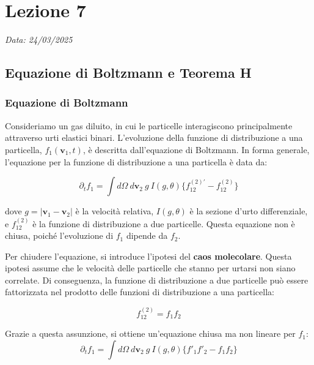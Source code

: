 \chapter{Lezione 7}
\label{chap:lezione_07} %

\begin{flushright}
\textit{Data: 24/03/2025}
\end{flushright}


\section{Equazione di Boltzmann e Teorema H}

\subsection{Equazione di Boltzmann}
Consideriamo un gas diluito, in cui le particelle interagiscono principalmente attraverso urti elastici binari. L'evoluzione della funzione di distribuzione a una particella, $f_1(\mathbf{v}_1, t)$, è descritta dall'equazione di Boltzmann. In forma generale, l'equazione per la funzione di distribuzione a una particella è data da:

\begin{equation}
\partial_{t}f_{1}=\int d\Omega~d\mathbf{v}_{2}~g~I(g,\theta)\{f_{12}^{(2)'}-f_{12}^{(2)}\}
\end{equation}

dove $g = |\mathbf{v}_1 - \mathbf{v}_2|$ è la velocità relativa, $I(g, \theta)$ è la sezione d'urto differenziale, e $f_{12}^{(2)}$ è la funzione di distribuzione a due particelle. Questa equazione non è chiusa, poiché l'evoluzione di $f_1$ dipende da $f_2$.

Per chiudere l'equazione, si introduce l'ipotesi del \textbf{caos molecolare}. Questa ipotesi assume che le velocità delle particelle che stanno per urtarsi non siano correlate. Di conseguenza, la funzione di distribuzione a due particelle può essere fattorizzata nel prodotto delle funzioni di distribuzione a una particella:

\begin{equation}
f_{12}^{(2)}=f_{1}f_{2}
\end{equation}

Grazie a questa assunzione, si ottiene un'equazione chiusa ma non lineare per $f_1$:
\begin{equation}
\partial_{t}f_{1}=\int d\Omega~d\mathbf{v}_{2}~g~I(g,\theta)\{f'_{1}f'_{2}-f_{1}f_{2}\}
\end{equation}

